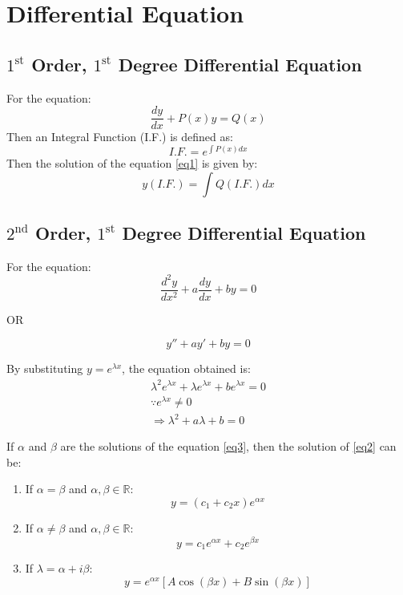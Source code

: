 \large{\chapter{Differential Equation}}

\section{$1^\text{st}$ Order, $1^\text{st}$ Degree Differential Equation}
For the equation:
\begin{equation}
	\dfrac{dy}{dx}+P(x)y=Q(x)\label{eq1}
\end{equation}
Then an Integral Function (I.F.) is defined as:
\begin{equation}
	I.F.=e^{\int P(x)dx}
\end{equation}
Then the solution of the equation \ref{eq1} is given by:
\begin{equation}
	y(I.F.)=\int Q (I.F.) dx
\end{equation}

\section{$2^\text{nd}$ Order, $1^\text{st}$ Degree Differential Equation}
For the equation:
\begin{equation}
	\dfrac{d^2 y}{dx^2}+a\dfrac{dy}{dx}+by=0\label{eq2}
\end{equation}
\begin{center}
	OR
\end{center}
\begin{equation}
	y''+ay'+by=0
\end{equation}

By substituting $y=e^{\lambda x}$, the equation obtained is:
\begin{align}
	\lambda^2 e^{\lambda x}+\lambda e^{\lambda x}+be^{\lambda x}=0\nonumber\\
	\because e^{\lambda x} \neq 0\nonumber\\
	\Rightarrow \lambda^2+a\lambda+b=0\label{eq3}
\end{align}

If $\alpha$ and $\beta$ are the solutions of the equation \ref{eq3}, then the solution of \ref{eq2} can be:
\begin{enumerate}

	\item If $\alpha = \beta$ and $\alpha,\beta\in\mathbb{R}$:
	\begin{equation}
		y=(c_1+c_2x)e^{\alpha x}
	\end{equation}

	\item If $\alpha \neq \beta$ and $\alpha,\beta\in\mathbb{R}$:
	\begin{equation}
		y=c_1 e^{\alpha x}+c_2 e^{\beta x}
	\end{equation}

	\item If $\lambda = \alpha + i \beta$:
	\begin{equation}
		y=e^{\alpha x}\left[A\cos (\beta x)+B\sin (\beta x) \right]
	\end{equation}
\end{enumerate}

